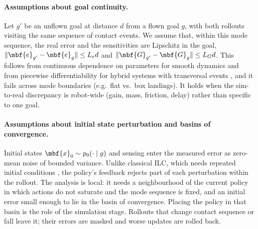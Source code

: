 
\paragraph{Assumptions about goal continuity.}
Let $g'$ be an unflown goal at distance $d$ from a flown goal $g$, with both rollouts visiting the same sequence of
contact events. We assume that, within this mode sequence, the real error and the sensitivities are Lipschitz in the
goal, $\|\mbf{e}_{g'}-\mbf{e}_g\|\le L_e d$ and $\|\mbf{G}_{g'}-\mbf{G}_g\|\le L_G d$. This follows from continuous
dependence on parameters for smooth dynamics \citep[Ch.~3]{khalil2002nonlinear} and from piecewise differentiability
for hybrid systems with transversal events \citep{burden2016pwd}, and it fails across mode boundaries (e.g.\ flat
vs.\ box landings). It holds when the sim-to-real discrepancy is robot-wide (gain, mass, friction, delay) rather than
specific to one goal.

\paragraph{Assumptions about initial state perturbation and basins of convergence.}
Initial states $\mbf{x}_0\sim p_0(\cdot\mid g)$ and sensing enter the measured error as zero-mean noise of bounded
variance. Unlike classical ILC, which needs repeated initial conditions \citep{heinzinger1992stability}, the policy's
feedback rejects part of each perturbation within the rollout. The analysis is local: it needs a neighbourhood of the
current policy in which actions do not saturate and the mode sequence is fixed, and an initial error small enough to
lie in the basin of convergence. Placing the policy in that basin is the role of the simulation stage. Rollouts that
change contact sequence or fall leave it; their errors are masked and worse updates are rolled back.

